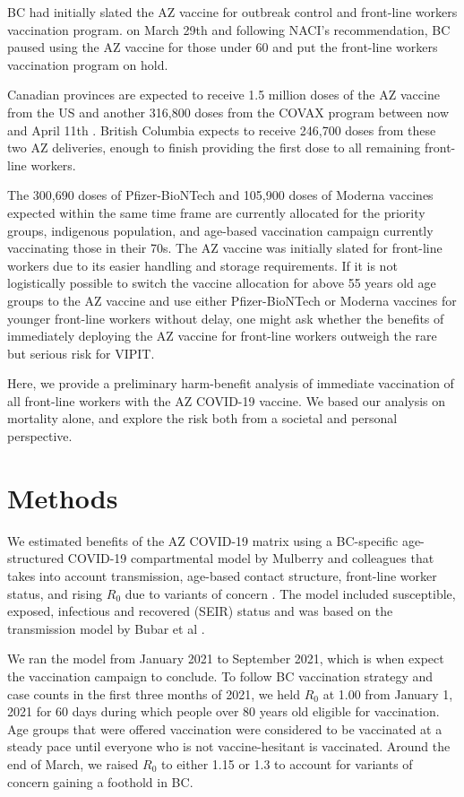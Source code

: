 \documentclass[]{interact}
\theoremstyle{plain}%
\theoremstyle{definition}
\theoremstyle{remark}
\begin{document}
BC had initially slated the AZ vaccine for outbreak control and
front-line workers vaccination program. on March 29th and following
NACI's recommendation, BC paused using the AZ vaccine for those under 60
and put the front-line workers vaccination program on hold.

Canadian provinces are expected to receive 1.5 million doses of the AZ
vaccine from the US and another 316,800 doses from the COVAX program
between now and April 11th \citep{government_of_canada_vaccines_2021}.
British Columbia expects to receive 246,700 doses from these two AZ
deliveries, enough to finish providing the first dose to all remaining
front-line workers.

The 300,690 doses of Pfizer-BioNTech and 105,900 doses of Moderna
vaccines expected within the same time frame are currently allocated for
the priority groups, indigenous population, and age-based vaccination
campaign currently vaccinating those in their 70s. The AZ vaccine was
initially slated for front-line workers due to its easier handling and
storage requirements. If it is not logistically possible to switch the
vaccine allocation for above 55 years old age groups to the AZ vaccine
and use either Pfizer-BioNTech or Moderna vaccines for younger
front-line workers without delay, one might ask whether the benefits of
immediately deploying the AZ vaccine for front-line workers outweigh the
rare but serious risk for VIPIT.

Here, we provide a preliminary harm-benefit analysis of immediate
vaccination of all front-line workers with the AZ COVID-19 vaccine. We
based our analysis on mortality alone, and explore the risk both from a
societal and personal perspective.

\hypertarget{methods}{%
\section{Methods}\label{methods}}

We estimated benefits of the AZ COVID-19 matrix using a BC-specific
age-structured COVID-19 compartmental model by Mulberry and colleagues
that takes into account transmission, age-based contact structure,
front-line worker status, and rising \(R_0\) due to variants of concern
\citep{mulberry_vaccine_2021}. The model included susceptible, exposed,
infectious and recovered (SEIR) status and was based on the transmission
model by Bubar et al \citep{bubar_model-informed_2021}.

We ran the model from January 2021 to September 2021, which is when
expect the vaccination campaign to conclude. To follow BC vaccination
strategy and case counts in the first three months of 2021, we held
\(R_0\) at 1.00 from January 1, 2021 for 60 days during which people
over 80 years old eligible for vaccination. Age groups that were offered
vaccination were considered to be vaccinated at a steady pace until
everyone who is not vaccine-hesitant is vaccinated. Around the end of
March, we raised \(R_0\) to either 1.15 or 1.3 to account for variants
of concern gaining a foothold in BC.
\end{document}
